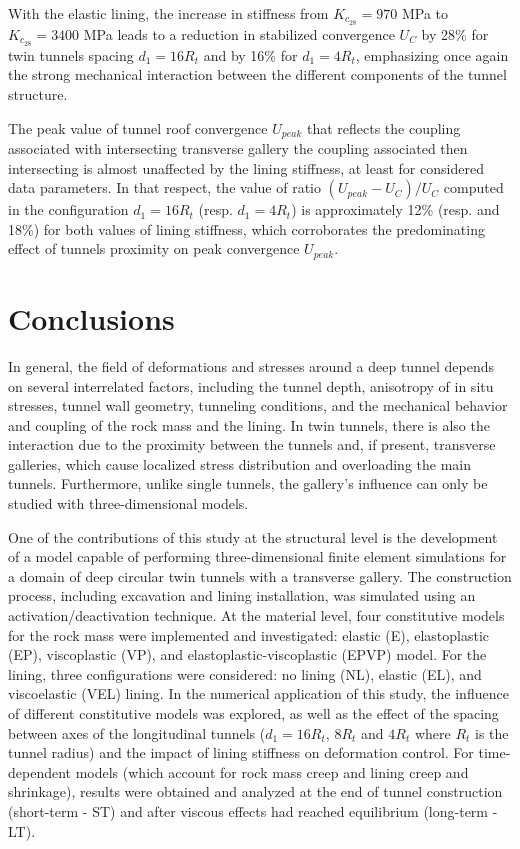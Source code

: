 \documentclass[a4paper,fleqn]{cas-sc}
\begin{document}
With the elastic lining, the increase in stiffness from $K_{c_{28}}=970$ MPa to $K_{c_{28}}=3400$ MPa leads to a reduction in stabilized convergence $U_C$ by 28\% for twin tunnels spacing  $d_1=16R_t$ and by 16\% for $d_1=4R_t$, emphasizing once again the strong mechanical interaction between the different components of the tunnel structure.

The peak value of tunnel roof convergence $U_{peak}$ that reflects the coupling associated with intersecting transverse gallery the coupling associated then intersecting is almost unaffected by the lining stiffness, at least for considered data parameters. In that respect, the value of ratio $(U_{peak}-U_C)/U_C$ computed in the configuration $d_1=16R_t$ (resp. $d_1=4R_t$) is  approximately 12\% (resp. and 18\%) for both values of lining stiffness, which corroborates the predominating effect of tunnels proximity on peak convergence $U_{peak}$. 

\section{Conclusions}\label{}

In general, the field of deformations and stresses around a deep tunnel depends on several interrelated factors, including the tunnel depth, anisotropy of in situ stresses, tunnel wall geometry, tunneling conditions, and the mechanical behavior and coupling of the rock mass and the lining. In twin tunnels, there is also the interaction due to the proximity between the tunnels and, if present, transverse galleries, which cause localized stress distribution and overloading the main tunnels. Furthermore, unlike single tunnels, the gallery's influence can only be studied with three-dimensional models.

One of the contributions of this study at the structural level is the development of a model capable of performing three-dimensional finite element simulations for a domain of deep circular twin tunnels with a transverse gallery. The construction process, including excavation and lining installation, was simulated using an activation/deactivation technique. At the material level, four constitutive models for the rock mass were implemented and investigated: elastic (E), elastoplastic (EP), viscoplastic (VP), and elastoplastic-viscoplastic (EPVP) model. For the lining, three configurations were considered: no lining (NL), elastic (EL), and viscoelastic (VEL) lining. In the numerical application of this study, the influence of different constitutive models was explored, as well as the effect of the spacing between axes of the longitudinal tunnels ($d_1 = 16R_t$, $8R_t$ and $4R_t$ where $R_t$ is the tunnel radius) and the impact of lining stiffness on deformation control. For time-dependent models (which account for rock mass creep and lining creep and shrinkage), results were obtained and analyzed at the end of tunnel construction (short-term - ST) and after viscous effects had reached equilibrium (long-term - LT).
\end{document}
